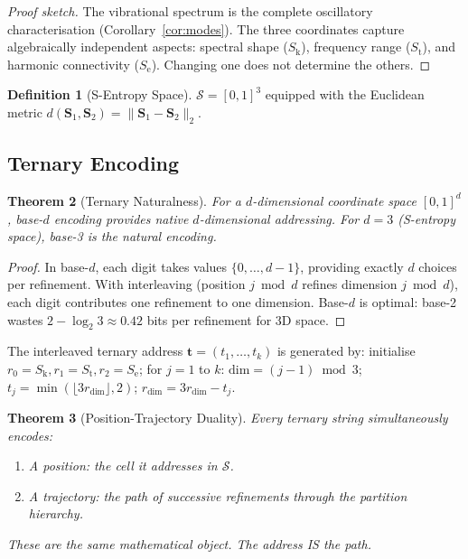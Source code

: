 \documentclass[11pt,twocolumn,a4paper]{article}
\newtheorem{theorem}{Theorem}[section]
\theoremstyle{definition}
\newtheorem{definition}[theorem]{Definition}
\theoremstyle{remark}
\newcommand{\Sk}{S_{\mathrm{k}}}
\newcommand{\St}{S_{\mathrm{t}}}
\newcommand{\Se}{S_{\mathrm{e}}}
\newcommand{\Sspace}{\mathcal{S}}
\begin{document}
\begin{proof}[Proof sketch]
The vibrational spectrum is the complete oscillatory characterisation (Corollary~\ref{cor:modes}). The three coordinates capture algebraically independent aspects: spectral shape ($\Sk$), frequency range ($\St$), and harmonic connectivity ($\Se$). Changing one does not determine the others.
\end{proof}

\begin{definition}[S-Entropy Space]
$\Sspace = [0,1]^3$ equipped with the Euclidean metric $d(\mathbf{S}_1, \mathbf{S}_2) = \|\mathbf{S}_1 - \mathbf{S}_2\|_2$.
\end{definition}

\subsection{Ternary Encoding}

\begin{theorem}[Ternary Naturalness]
\label{thm:ternary}
For a $d$-dimensional coordinate space $[0,1]^d$, base-$d$ encoding provides native $d$-dimensional addressing. For $d = 3$ (S-entropy space), base-3 is the natural encoding.
\end{theorem}

\begin{proof}
In base-$d$, each digit takes values $\{0, \ldots, d-1\}$, providing exactly $d$ choices per refinement. With interleaving (position $j \bmod d$ refines dimension $j \bmod d$), each digit contributes one refinement to one dimension. Base-$d$ is optimal: base-2 wastes $2 - \log_2 3 \approx 0.42$ bits per refinement for 3D space.
\end{proof}

The interleaved ternary address $\mathbf{t} = (t_1, \ldots, t_k)$ is generated by: initialise $r_0 = \Sk, r_1 = \St, r_2 = \Se$; for $j = 1$ to $k$: $\mathrm{dim} = (j-1) \bmod 3$; $t_j = \min(\lfloor 3 r_{\mathrm{dim}} \rfloor, 2)$; $r_{\mathrm{dim}} = 3 r_{\mathrm{dim}} - t_j$.

\begin{theorem}[Position-Trajectory Duality]
\label{thm:duality}
Every ternary string simultaneously encodes:
\begin{enumerate}[nosep]
\item A \emph{position}: the cell it addresses in $\Sspace$.
\item A \emph{trajectory}: the path of successive refinements through the partition hierarchy.
\end{enumerate}
These are the same mathematical object. The address IS the path.
\end{theorem}
\end{document}

